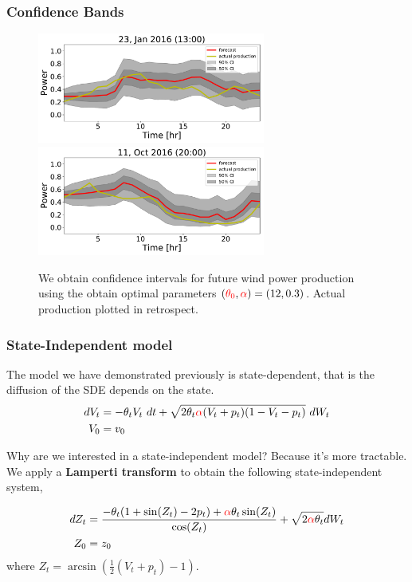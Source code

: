 \documentclass[aspectratio=169]{beamer}\usepackage[utf8]{inputenc}
\begin{document}
\begin{frame}\frametitle{Confidence Bands}
    \begin{figure}
      \includegraphics[width=75mm,scale=1]{confidence_intervals/24hr/31.pdf}
      \includegraphics[width=75mm,scale=1]{confidence_intervals/24hr/820.pdf}
       \caption{We obtain confidence intervals for future wind power production using the obtain optimal parameters $(\textcolor{red}{\theta_0}, \textcolor{red}{\alpha} )=(12,0.3)$. Actual production plotted in retrospect. }
    \end{figure}
\end{frame}

\begin{frame}\frametitle{State-Independent model}
The model we have demonstrated previously is state-dependent, that is the diffusion of the SDE depends on the state.
\begin{equation}
\begin{split}
dV_t &=  - \theta_t V_t \  dt + \sqrt{2 \theta_t \textcolor{red}{\alpha} (V_t +p_t ) (1-V_t-p_t)} \  dW_t  \\ %
V_0 & = v_0\\
\end{split}\label{VtSDE}
\end{equation}

Why are we interested in a state-independent model? Because it's more tractable.\\
We apply a \textbf{Lamperti transform} to obtain the following state-independent system,

\begin{equation}
  \begin{split}
    dZ_t&= \frac{- \theta_t (1+ \sin(Z_t) - 2p_t) + \textcolor{red}{\alpha} \theta_t \sin (Z_t)   }{\cos (Z_t)} + \sqrt{2 \textcolor{red}{\alpha} \theta_t} dW_t \\
    Z_0&=z_0
  \end{split}
\end{equation}
where $Z_t = \arcsin \left( \frac{1}{2} \left( V_t+p_t \right) - 1 \right) $.
\end{frame}
\end{document}
